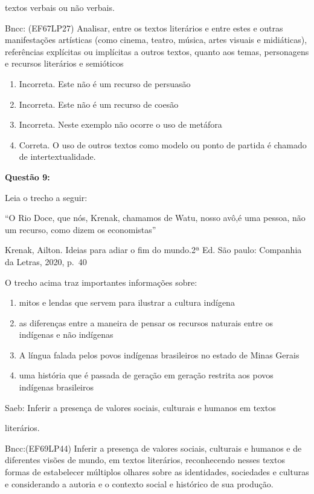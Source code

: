 {textos verbais ou não verbais.

Bncc: (EF67LP27) Analisar, entre os textos literários e entre estes e
outras manifestações artísticas (como cinema, teatro, música, artes
visuais e midiáticas), referências explícitas ou implícitas a outros
textos, quanto aos temas, personagens e recursos literários e semióticos

\begin{enumerate}
\def\labelenumi{\arabic{enumi}.}
\item
  Incorreta. Este não é um recurso de persuasão
\item
  Incorreta. Este não é um recurso de coesão
\item
  Incorreta. Neste exemplo não ocorre o uso de metáfora
\item
  Correta. O uso de outros textos como modelo ou ponto de partida é
  chamado de intertextualidade.
\end{enumerate}

\textbf{Questão 9:}

Leia o trecho a seguir:

``O Rio Doce, que nós, Krenak, chamamos de Watu, nosso avô,é uma pessoa,
não um recurso, como dizem os economistas''

Krenak, Ailton. Ideias para adiar o fim do mundo.2ª Ed. São paulo:
Companhia da Letras, 2020, p.~40

O trecho acima traz importantes informações sobre:

\begin{enumerate}
\def\labelenumi{\alph{enumi})}
\item
  mitos e lendas que servem para ilustrar a cultura indígena
\item
  as diferenças entre a maneira de pensar os recursos naturais entre os
  indígenas e não indígenas
\item
  A língua falada pelos povos indígenas brasileiros no estado de Minas
  Gerais
\item
  uma história que é passada de geração em geração restrita aos povos
  indígenas brasileiros
\end{enumerate}

Saeb: Inferir a presença de valores sociais, culturais e humanos em
textos

literários.

Bncc:(EF69LP44) Inferir a presença de valores sociais, culturais e
humanos e de diferentes visões de mundo, em textos literários,
reconhecendo nesses textos formas de estabelecer múltiplos olhares sobre
as identidades, sociedades e culturas e considerando a autoria e o
contexto social e histórico de sua produção.

}
